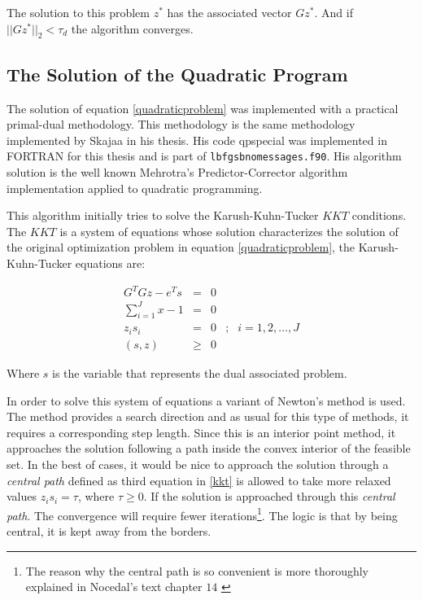 The solution to this problem $z^*$ has the associated vector $Gz^*$. And if $||Gz^*||_2 < \tau_d$ the algorithm converges.

\subsection{The Solution of the Quadratic Program}

The solution of equation \eqref{quadraticproblem} was implemented with a practical primal-dual methodology. This methodology is the same methodology implemented by Skajaa \citep{skajaa} in his thesis. His code \textsf{qpspecial} was implemented in \textsc{FORTRAN} for this thesis and is part of \texttt{lbfgsbnomessages.f90}. His algorithm solution is the well known Mehrotra's Predictor-Corrector algorithm implementation applied to quadratic programming.

This algorithm initially tries to solve the Karush-Kuhn-Tucker $KKT$ conditions. The $KKT$ is a system of equations whose solution characterizes the solution of the original optimization problem in equation \eqref{quadraticproblem}, the Karush-Kuhn-Tucker equations are:

\begin{equation} \label{kkt}
  \begin{aligned}
    G^TGz - e^Ts
    & = & 0 & \\
    \sum_{i = 1}^J x - 1
    & = & 0 & \\
    z_is_i & = & 0 &; &i = 1,2, \dots, J\\
    (s, z) & \geq & 0 &
  \end{aligned}
\end{equation}

Where $s$ is the variable that represents the dual associated problem.

In order to solve this system of equations a variant of Newton's method is used. The method provides a search direction and as usual for this type of methods, it  requires a corresponding step length. Since this is an interior point method, it approaches the solution following a path inside the convex interior of the feasible set.  In the best of cases, it would be nice to approach the solution through a \emph{central path} defined as third equation in \eqref{kkt} is allowed to take more relaxed values $z_is_i = \tau$, where $\tau \geq 0$. If the solution is approached through this \emph{central path}. The convergence will require fewer iterations\footnote{The reason why the central path is so convenient is more thoroughly explained in Nocedal's text chapter $14$ \citep{nocedal}}. The logic is that by being central, it is kept away from the borders.

